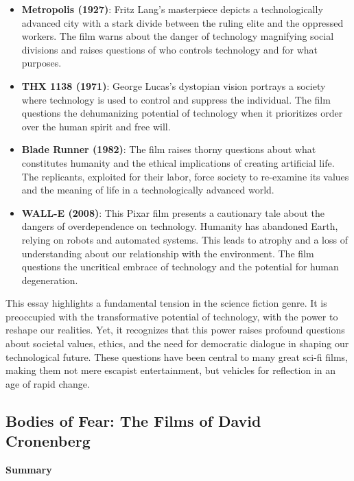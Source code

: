 \documentclass[11pt,fleqn]{book} %
\begin{document}
\begin{itemize}
\item \textbf{Metropolis (1927)}:  Fritz Lang's masterpiece depicts a technologically advanced city with a stark divide between the ruling elite and the oppressed workers. The film warns about the danger of technology magnifying social divisions and raises questions of who controls technology and for what purposes.

\item \textbf{THX 1138 (1971)}: George Lucas's dystopian vision portrays a society where technology is used to control and suppress the individual. The film questions the dehumanizing potential of technology when it prioritizes order over the human spirit and free will.

\item \textbf{Blade Runner (1982)}: The film raises thorny questions about what constitutes humanity and the ethical implications of creating artificial life. The replicants, exploited for their labor, force society to re-examine its values and the meaning of life in a technologically advanced world.

\item \textbf{WALL-E (2008)}: This Pixar film presents a cautionary tale about the dangers of overdependence on technology.  Humanity has abandoned Earth, relying on robots and automated systems. This leads to atrophy and a loss of understanding about our relationship with the environment. The film questions the uncritical embrace of technology and the potential for human degeneration.
\end{itemize}
\vspace{5pt}

This essay highlights a fundamental tension in the science fiction genre. It is preoccupied with the transformative potential of technology, with the power to reshape our realities. Yet, it recognizes that this power raises profound questions about societal values, ethics, and the need for democratic dialogue in shaping our technological future.  These questions have been central to many great sci-fi films, making them not mere escapist entertainment, but vehicles for reflection in an age of rapid change.


\subsection{Bodies of Fear: The Films of David Cronenberg}
\textbf{Summary}
\end{document}
